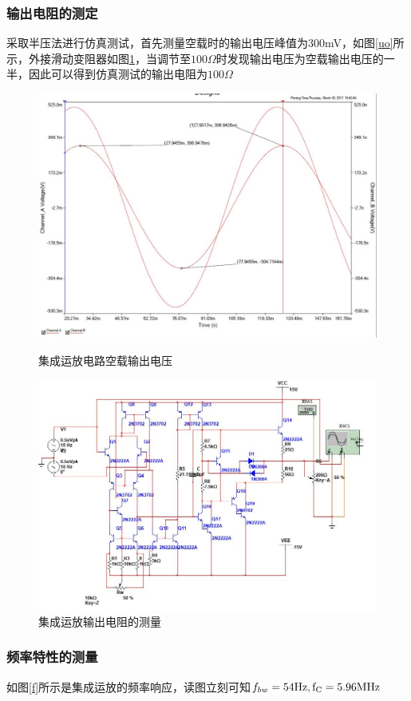 \documentclass[UTF8,a4paper]{ctexart}
\begin{document}
\subsubsection{输出电阻的测定}
采取半压法进行仿真测试，首先测量空载时的输出电压峰值为300mV，如图\ref{uo}所示，外接滑动变阻器如图\ref{ro}，当调节至$100\Omega$时发现输出电压为空载输出电压的一半，因此可以得到仿真测试的输出电阻为$100\Omega$
\begin{figure}
\centering
\includegraphics[width=\textwidth]{3-4Uo.jpg}
\caption{集成运放电路空载输出电压}
\label{uo}
\includegraphics[width=\textwidth]{3-4Ro.jpg}
\caption{集成运放输出电阻的测量}
\label{ro}
\end{figure}
\subsubsection{频率特性的测量}
如图\ref{f}所示是集成运放的频率响应，读图立刻可知$f_{bw}=54\rm{Hz},f_C=5.96\rm{MHz}$
\end{document}
